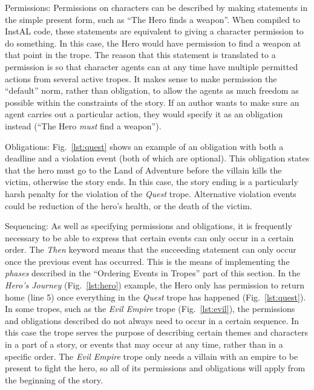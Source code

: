\begin{compactdesc}
\item[Permissions:]
Permissions on characters can be described by making statements in the simple present form, such as ``The Hero finds a weapon''. When compiled to InstAL code, these statements are equivalent to giving a character permission to do something. In this case, the Hero would have permission to find a weapon at that point in the trope.
The reason that this statement is translated to a permission is so that character agents can at any time have multiple permitted actions from several active tropes. It makes sense to make permission the ``default'' norm, rather than obligation, to allow the agents as much freedom as possible within the constraints of the story. If an author wants to make sure an agent carries out a particular action, they would specify it as an obligation instead (``The Hero \emph{must} find a weapon'').

\item[Obligations:]
Fig.~\ref{lst:quest} shows an example of an obligation with both a deadline and a violation event (both of which are optional). This obligation states that the hero must go to the Land of Adventure before the villain kills the victim, otherwise the story ends. In this case, the story ending is a particularly harsh penalty for the violation of the \emph{Quest} trope. Alternative violation events could be reduction of the hero's health, or the death of the victim.

\item[Sequencing:]
As well as specifying permissions and obligations, it is frequently necessary to be able to express that certain events can only occur in a certain order. The \emph{Then} keyword means that the succeeding statement can only occur once the previous event has occurred. This is the means of implementing the \emph{phases} described in the ``Ordering Events in Tropes'' part of this section. In the \emph{Hero's Journey} (Fig.~\ref{lst:hero}) example, the Hero only has permission to return home (line 5) once everything in the \emph{Quest} trope has happened (Fig.~\ref{lst:quest}).
In some tropes, such as the \emph{Evil Empire} trope (Fig.~\ref{lst:evil}), the permissions and obligations described do not always need to occur in a certain sequence. In this case the trope serves the purpose of describing certain themes and characters in a part of a story, or events that may occur at any time, rather than in a specific order. The \emph{Evil Empire} trope only needs a villain with an empire to be present to fight the hero, so all of its permissions and obligations will apply from the beginning of the story.


\end{compactdesc}
